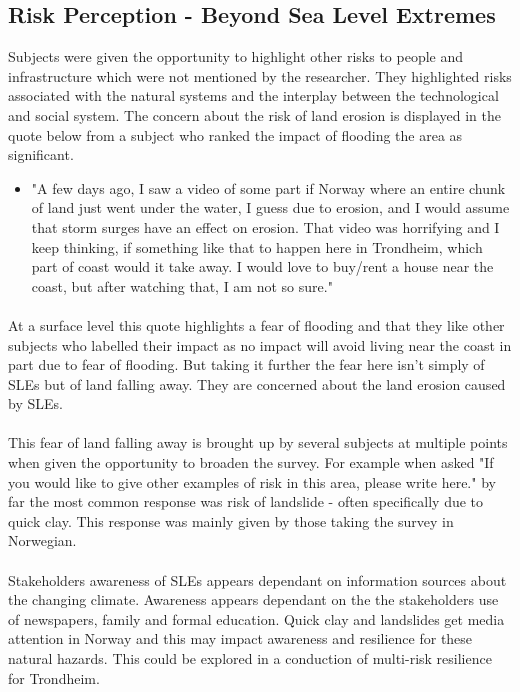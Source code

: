 \subsection{Risk Perception - Beyond Sea Level Extremes}
Subjects were given the opportunity to highlight other risks to people and infrastructure which were not mentioned by the researcher. They highlighted risks associated with the natural systems and the interplay between the technological and social system. The concern about the risk of land erosion is displayed in the quote below from a subject who ranked the impact of flooding the area as significant.

\begin{itemize}
    \item "A few days ago, I saw a video of some part if Norway where an entire chunk of land just went under the water, I guess due to erosion, and I would assume that storm surges have an effect on erosion. That video was horrifying and I keep thinking, if something like that to happen here in Trondheim, which part of coast would it take away. I would love to buy/rent a house near the coast, but after watching that, I am not so sure."
\end{itemize}
\paragraph{}

At a surface level this quote highlights a fear of flooding and that they like other subjects who labelled their impact as no impact will avoid living near the coast in part due to fear of flooding. But taking it further the fear here isn't simply of SLEs but of land falling away. They are concerned about the land erosion caused by SLEs.
\paragraph{}
This fear of land falling away is brought up by several subjects at multiple points when given the opportunity to broaden the survey. For example when asked "If you would like to give other examples of risk in this area, please write here." by far the most common response was risk of landslide - often specifically due to quick clay. This response was mainly given by those taking the survey in Norwegian. 
\paragraph{}
Stakeholders awareness of SLEs appears dependant on information sources about the changing climate. Awareness appears dependant on the the stakeholders use of newspapers, family and formal education. Quick clay and landslides get media attention in Norway and this may impact awareness and resilience for these natural hazards. This could be explored in a conduction of multi-risk resilience for Trondheim.  
